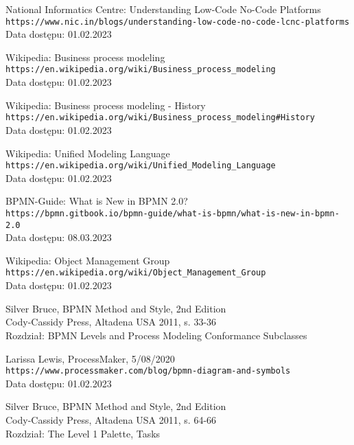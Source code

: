 \documentclass[declaration,shortabstract,mgr]{iithesis}
\begin{document}

\begin{thebibliography}{1}

National Informatics Centre: Understanding Low-Code No-Code Platforms \\
\texttt{https://www.nic.in/blogs/understanding-low-code-no-code-lcnc-platforms} \\
Data dostępu: 01.02.2023

Wikipedia: Business process modeling \\
\texttt{https://en.wikipedia.org/wiki/Business\_process\_modeling} \\
Data dostępu: 01.02.2023

Wikipedia: Business process modeling - History \\
\texttt{https://en.wikipedia.org/wiki/Business\_process\_modeling\#History} \\
Data dostępu: 01.02.2023

Wikipedia: Unified Modeling Language \\
\texttt{https://en.wikipedia.org/wiki/Unified\_Modeling\_Language} \\
Data dostępu: 01.02.2023

BPMN-Guide: What is New in BPMN 2.0? \\
\texttt{https://bpmn.gitbook.io/bpmn-guide/what-is-bpmn/what-is-new-in-bpmn-2.0} \\
Data dostępu: 08.03.2023




Wikipedia: Object Management Group \\
\texttt{https://en.wikipedia.org/wiki/Object\_Management\_Group} \\
Data dostępu: 01.02.2023

Silver Bruce, BPMN Method and Style, 2nd Edition \\
Cody-Cassidy Press, Altadena USA 2011, s. 33-36 \\
Rozdział: BPMN Levels and Process Modeling Conformance Subclasses

Larissa Lewis, ProcessMaker, 5/08/2020 \\
\texttt{https://www.processmaker.com/blog/bpmn-diagram-and-symbols} \\
Data dostępu: 01.02.2023

Silver Bruce, BPMN Method and Style, 2nd Edition \\
Cody-Cassidy Press, Altadena USA 2011, s. 64-66 \\
Rozdział: The Level 1 Palette, Tasks


\end{thebibliography}
\end{document}
